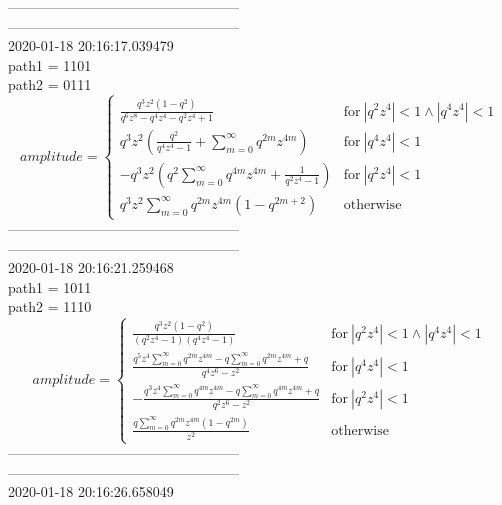 --------------------------------------------------\\
--------------------------------------------------\\
2020-01-18 20:16:17.039479\\
path1 = 1101\\
path2 = 0111\\
$$amplitude = \begin{cases} \frac{q^{3} z^{2} \left(1 - q^{2}\right)}{q^{6} z^{8} - q^{4} z^{4} - q^{2} z^{4} + 1} & \text{for}\: \left|{q^{2} z^{4}}\right| < 1 \wedge \left|{q^{4} z^{4}}\right| < 1 \\q^{3} z^{2} \left(\frac{q^{2}}{q^{4} z^{4} - 1} + \sum_{m=0}^{\infty} q^{2 m} z^{4 m}\right) & \text{for}\: \left|{q^{4} z^{4}}\right| < 1 \\- q^{3} z^{2} \left(q^{2} \sum_{m=0}^{\infty} q^{4 m} z^{4 m} + \frac{1}{q^{2} z^{4} - 1}\right) & \text{for}\: \left|{q^{2} z^{4}}\right| < 1 \\q^{3} z^{2} \sum_{m=0}^{\infty} q^{2 m} z^{4 m} \left(1 - q^{2 m + 2}\right) & \text{otherwise} \end{cases}$$
--------------------------------------------------\\
--------------------------------------------------\\
2020-01-18 20:16:21.259468\\
path1 = 1011\\
path2 = 1110\\
$$amplitude = \begin{cases} \frac{q^{3} z^{2} \left(1 - q^{2}\right)}{\left(q^{2} z^{4} - 1\right) \left(q^{4} z^{4} - 1\right)} & \text{for}\: \left|{q^{2} z^{4}}\right| < 1 \wedge \left|{q^{4} z^{4}}\right| < 1 \\\frac{q^{5} z^{4} \sum_{m=0}^{\infty} q^{2 m} z^{4 m} - q \sum_{m=0}^{\infty} q^{2 m} z^{4 m} + q}{q^{4} z^{6} - z^{2}} & \text{for}\: \left|{q^{4} z^{4}}\right| < 1 \\- \frac{q^{3} z^{4} \sum_{m=0}^{\infty} q^{4 m} z^{4 m} - q \sum_{m=0}^{\infty} q^{4 m} z^{4 m} + q}{q^{2} z^{6} - z^{2}} & \text{for}\: \left|{q^{2} z^{4}}\right| < 1 \\\frac{q \sum_{m=0}^{\infty} q^{2 m} z^{4 m} \left(1 - q^{2 m}\right)}{z^{2}} & \text{otherwise} \end{cases}$$
--------------------------------------------------\\
--------------------------------------------------\\
2020-01-18 20:16:26.658049\\

